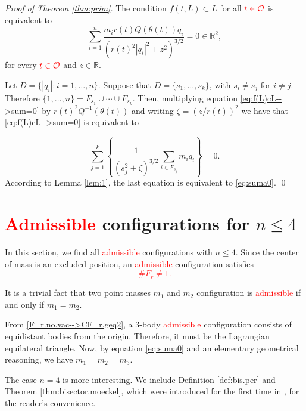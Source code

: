 \documentclass[smallcondensed]{svjour3}
\newcommand{\rr}{\mathbb{R}}
\begin{document}
\begin{proof}[Proof of Theorem \ref{thm:prim}]
The condition $f(t,L)\subset L$ for all $\textcolor{red}{t\in\mathcal{O}}$ is equivalent to
\begin{equation}\label{eq:f(L)cL-->sum=0}
 \sum_{i=1}^n\frac{m_ir(t)Q(\theta (t))q_i}{\left(r(t)^2|q_i|^2+z^2\right)^{3/2}}=0\in\rr^2,
\end{equation}
for every $\textcolor{red}{t\in\mathcal{O}}$ and $z\in \rr$.

Let $D=\{|q_i|: i=1,\ldots,n\}$.  Suppose that $D=\{s_1,\ldots,s_k\}$, with $s_i\neq s_j$ for $i\neq j$.  Therefore $\{1,\ldots,n\}=F_{s_1}\cup \cdots\cup F_{s_k}$. Then, multiplying equation \eqref{eq:f(L)cL-->sum=0} by $r(t)^2Q^{-1}(\theta(t))$  and writing $\zeta=(z/r(t))^2$ we have that \eqref{eq:f(L)cL-->sum=0} is equivalent to


\[\sum_{j=1}^k\left\{\frac{1}{(s_j^{2}+\zeta)^{3/2}}\sum_{i\in F_{s_j}}m_iq_i\right\}=0.\]
According to Lemma \ref{lem:1}, the last equation is equivalent to \eqref{eq:suma0}. \qed
\end{proof}


\section{\textcolor{red}{Admissible}  configurations for $n\leq 4$}\label{sec:addmisibles}


In this section, we find all \textcolor{red}{admissible}  configurations with $n\leq 4$.    Since the center of mass is an excluded position, an \textcolor{red}{admissible} configuration satisfies
\textcolor{red}{
\begin{equation}\label{F_r.no.vac-->CF_r.geq2}
 \# F_r\neq 1.
\end{equation}
}


It is a trivial fact that  two point masses $m_1$ and $m_2$ configuration is \textcolor{red}{admissible} if and only if $m_1=m_2$.


From \eqref{F_r.no.vac-->CF_r.geq2}, a $3$-body \textcolor{red}{admissible}  configuration consists of equidistant  bodies from the origin. Therefore, it must  be the Lagrangian equilateral triangle. Now, by equation \eqref{eq:suma0} and an elementary geometrical reasoning,   we have  $m_1=m_2=m_3$.



The case $n=4$ is more interesting. We include Definition \ref{def:bis.per} and Theorem \ref{thm:bisector.moeckel}, which were introduced  for the first time in  \cite{moeckel1990central}, for the reader's convenience.
\end{document}
